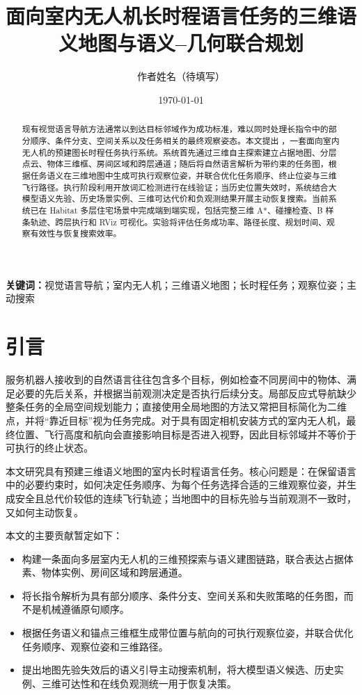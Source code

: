 \documentclass[UTF8,11pt]{ctexart}
\title{面向室内无人机长时程语言任务的三维语义地图与语义--几何联合规划}
\author{作者姓名（待填写）}
\date{\today}
\begin{document}
\maketitle

\begin{abstract}
现有视觉语言导航方法通常以到达目标邻域作为成功标准，难以同时处理长指令中的部分顺序、条件分支、空间关系以及任务相关的最终观察姿态。本文提出 \systemname，一套面向室内无人机的预建图长时程任务执行系统。系统首先通过三维自主探索建立占据地图、分层点云、物体三维框、房间区域和跨层通道；随后将自然语言解析为带约束的任务图，根据任务语义在三维地图中生成可执行观察位姿，并联合优化任务顺序、终止位姿与三维飞行路径。执行阶段利用开放词汇检测进行在线验证；当历史位置失效时，系统结合大模型语义先验、历史场景实例、三维可达代价和负观测结果开展主动恢复搜索。当前系统已在 Habitat 多层住宅场景中完成端到端实现，包括完整三维 A*、碰撞检查、B 样条轨迹、跨层执行和 RViz 可视化。实验将评估任务成功率、路径长度、规划时间、观察有效性与恢复搜索效率。
\end{abstract}

\noindent\textbf{关键词：}视觉语言导航；室内无人机；三维语义地图；长时程任务；观察位姿；主动搜索

\overviewfigure

\section{引言}
服务机器人接收到的自然语言往往包含多个目标，例如检查不同房间中的物体、满足必要的先后关系，并根据当前观测决定是否执行后续分支。局部反应式导航缺少整条任务的全局空间规划能力；直接使用全局地图的方法又常把目标简化为二维点，并将“靠近目标”视为任务完成。对于具有固定相机安装方式的室内无人机，最终位置、飞行高度和航向会直接影响目标是否进入视野，因此目标邻域并不等价于可执行的终止状态。

本文研究具有预建三维语义地图的室内长时程语言任务。核心问题是：在保留语言中的必要约束时，如何决定任务顺序、为每个任务选择合适的三维观察位姿，并生成安全且总代价较低的连续飞行轨迹；当地图中的目标先验与当前观测不一致时，又如何主动恢复。

本文的主要贡献暂定如下：
\begin{itemize}[leftmargin=*]
  \item 构建一条面向多层室内无人机的三维预探索与语义建图链路，联合表达占据体素、物体实例、房间区域和跨层通道。
  \item 将长指令解析为具有部分顺序、条件分支、空间关系和失败策略的任务图，而不是机械遵循原句顺序。
  \item 根据任务语义和锚点三维框生成带位置与航向的可执行观察位姿，并联合优化任务顺序、观察位姿和三维路径。
  \item 提出地图先验失效后的语义引导主动搜索机制，将大模型语义候选、历史实例、三维可达性和在线负观测统一用于恢复决策。
\end{itemize}
\end{document}
